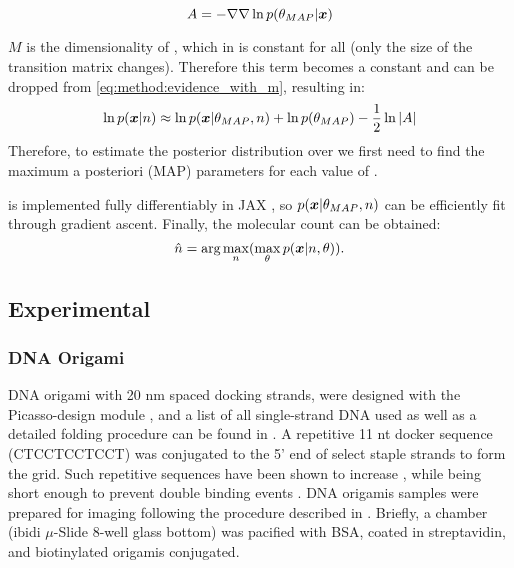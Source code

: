   \begin{equation*}
    A = -\nabla \nabla \ln p(\theta_{MAP} | \bm{x})
  \end{equation*}

  $M$ is the dimensionality of \parameters, which in \ours is constant for all \n (only the size of the transition matrix changes).
  Therefore this term becomes a constant and can be dropped from \eqref{eq:method:evidence_with_m}, resulting in:
  \begin{equation}
    \ln p(\bm{x} | n) \approx \ln p(\bm{x} | \theta_{MAP}, n) + \ln p(\theta_{MAP}) - \frac{1}{2} \ln |A|
    \label{eq:method:evidence}
  \end{equation}
  Therefore, to estimate the posterior distribution over \n we first need to 
  find the maximum a posteriori (MAP) parameters for each value of \n. 

  \ours is implemented fully differentiably in JAX , so $p(\bm{x} | \theta_{MAP}, n)$ can be efficiently 
  fit through gradient ascent.
  Finally, the molecular count can be obtained:
  \begin{equation}
      \hat{n} =
      \text{arg}\max_{n}(
      \max_\theta
      p(\bm{x}|n,\theta))
    \text{.}
    \label{eq:method:optimization}
  \end{equation}

\subsection{Experimental}
\subsubsection{DNA Origami}
DNA origami with 20 nm spaced docking strands, were designed with the Picasso-design module \cite{schnitzbauer_2017}, 
  and a list of all single-strand DNA used as well as a detailed folding procedure can be found in \cite{schnitzbauer_2017}.
  A repetitive 11 nt docker sequence (CTCCTCCTCCT) was conjugated to the 5' end of select staple strands to form the grid.
  Such repetitive sequences have been shown to increase \pon, while being short enough to prevent double binding events \cite{civitci_2020}.
  DNA origamis samples were prepared for imaging following the procedure described in \cite{schnitzbauer_2017}. 
  Briefly, a chamber (ibidi $\mu$-Slide 8-well glass bottom) was pacified with BSA, coated in streptavidin, and biotinylated origamis conjugated. 

